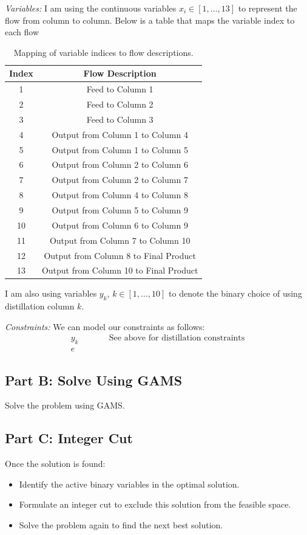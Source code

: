 \documentclass[11pt]{article}
\begin{document}
\textit{Variables:}
I am using the continuous variables $x_i \in [1,\dots,13]$ to represent the flow from column to column.
Below is a table that maps the variable index to each flow
\begin{table}[htbp]
\centering
\begin{tabular}{|c|c|}
\hline
\textbf{Index} & \textbf{Flow Description} \\ \hline
1 & Feed to Column 1 \\ \hline
2 & Feed to Column 2 \\ \hline
3 & Feed to Column 3 \\ \hline
4 & Output from Column 1 to Column 4 \\ \hline
5 & Output from Column 1 to Column 5 \\ \hline
6 & Output from Column 2 to Column 6 \\ \hline
7 & Output from Column 2 to Column 7 \\ \hline
8 & Output from Column 4 to Column 8 \\ \hline
9 & Output from Column 5 to Column 9 \\ \hline
10 & Output from Column 6 to Column 9 \\ \hline
11 & Output from Column 7 to Column 10 \\ \hline
12 & Output from Column 8 to Final Product \\ \hline
13 & Output from Column 10 to Final Product \\ \hline
\end{tabular}
\caption{Mapping of variable indices to flow descriptions.}
\label{tab:flow_mapping}
\end{table}
I am also using variables $y_k$, $k \in [1,\dots,10]$ to denote the binary choice of using distillation column $k$.

\textit{Constraints:}
We can model our constraints as follows:
\begin{align*}
  y_k & \quad & \quad \text{See above for distillation constraints} \\
   e
\end{align*}


\subsection{Part B: Solve Using GAMS}
Solve the problem using GAMS.

\subsection{Part C: Integer Cut}
Once the solution is found:
\begin{itemize}
  \item Identify the active binary variables in the optimal solution.
  \item Formulate an integer cut to exclude this solution from the feasible space.
  \item Solve the problem again to find the next best solution.
\end{itemize}
\end{document}
